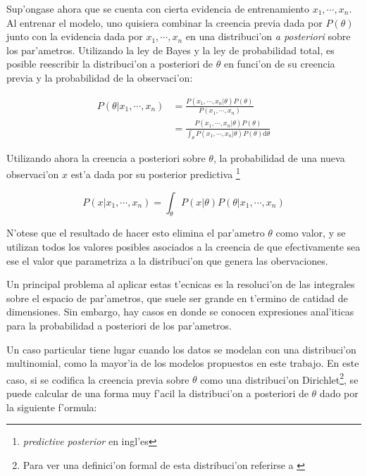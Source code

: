 Sup'ongase ahora que se cuenta con cierta evidencia de entrenamiento $x_1,\cdots,x_n$. Al entrenar el modelo, uno quisiera combinar la 
creencia previa dada por $P(\theta)$ junto con la evidencia dada por $x_1,\cdots,x_n$ en una distribuci'on \emph{a posteriori} sobre los par'ametros.
Utilizando la ley de Bayes y la ley de probabilidad total, es posible reescribir la distribuci'on a posteriori de $\theta$ en funci'on de su creencia previa y 
la probabilidad de la observaci'on:

\begin{align*}
P(\theta|x_1,\cdots,x_n) &= \frac{P(x_1,\cdots,x_n|\theta) P(\theta)}{P(x_1,\cdots,x_n)} \\
                         &= \frac{P(x_1,\cdots,x_n|\theta) P(\theta)}{\int_\theta{P(x_1,\cdots,x_n|\theta)P(\theta)\mathrm{d}\theta}}
\end{align*}

Utilizando ahora la creencia a posteriori sobre $\theta$, la probabilidad de una nueva observaci'on $x$ est'a dada por su posterior predictiva
\footnote{\emph{predictive posterior} en ingl'es}

$$P(x|x_1,\cdots,x_n) = \int_\theta{P(x|\theta)P(\theta|x_1,\cdots,x_n)}$$

N'otese que el resultado de hacer esto elimina el par'ametro $\theta$ como valor, y se utilizan todos los valores posibles asociados a la 
creencia de que efectivamente sea ese el valor que parametriza a la distribuci'on que genera las obervaciones.


Un principal problema al aplicar estas t'ecnicas es la resoluci'on de las integrales sobre el espacio de par'ametros, que suele ser grande en t'ermino
de catidad de dimensiones. 
Sin embargo, hay casos en donde se conocen expresiones anal'iticas para la probabilidad a posteriori de los par'ametros.


Un caso particular tiene lugar cuando los datos se modelan con una distribuci'on multinomial, como la mayor'ia  de los modelos propuestos en este trabajo.
En este caso, si se codifica la creencia previa
sobre $\theta$ como una distribuci'on Dirichlet\footnote{Para ver una definici'on formal de esta distribuci'on referirse a \cite{minka2003dir}}, se puede calcular de una forma muy f'acil la distribuci'on a posteriori de $\theta$ dado por la siguiente
f'ormula:

